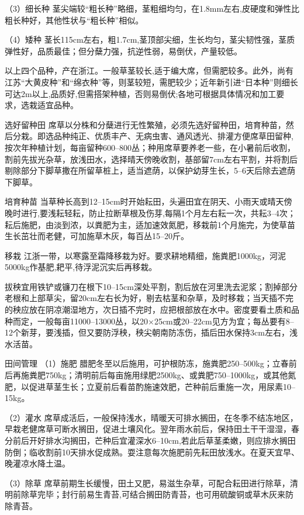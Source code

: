 \documentclass{ctexbook}
\begin{document}
（3）细长种 茎尖端较“粗长种”略细，茎粗细均匀，在1.8mm左右,皮硬度和弹性比粗长种好，其他性状与“粗长种”相似。

（4）矮种 茎长115cm左右，粗1.7cm,茎顶部尖细，生长均匀，茎尖韧性强，茎质弹性好，品质最佳；但分蘖力强，抗逆性弱，易倒伏，产量较低。

以上四个品种，产在浙江。一般草茎较长,适于编大席，但需肥较多。此外，尚有江苏“大黄皮种”和“绵衣种”等，则茎较短，需肥较少；近年新引进“日本种”则细长可达2m以上,品质好,但需搭架种植，否则易倒伏;各地可根据具体情况和加工要求，选栽适宜品种。

选好留种田 席草以分株和分蘖进行无性繁殖，必须先选好留种田，培育种苗，然后分栽。即选品种纯正、优质丰产、无病虫害、通风透光、排灌方便席草田留种,按次年种植计划，每亩留种600--800丛；种用席草要养老一些，在小暑前后收割，割前先拔光杂草，放浅田水，选择晴天傍晚收割，基部留7cm左右平割，并将割后剔除部分下脚草撒在所留草桩上，适当遮荫，以保护幼芽生长，5--6天后除去遮荫下脚草。

培育种苗 当草种长高到12--15cm时开始耘田，头遍田宜在阴天、小雨天或晴天傍晚时进行,要浅耘轻耘，防止拉断草根及伤芽,每隔1个月左右耘一次，共耘3--4次；耘后施肥，由淡到浓，以粪肥为主，适加速效氮肥，移栽前1个月施完，为使草苗生长茁壮而老健，可加施草木灰，每百丛15--20斤。

移栽 江浙一带，以寒露至霜降移栽为好。要求耕地精细，施粪肥1000kg，河泥5000kg作基肥,耙平,待浮泥沉实后再移栽。

拔秧宜用铁铲或镰刀在根下10--15cm深处平割，割后放在河里洗去泥浆；割掉部分老根和上部草尖，留20cm左右长为好，剔去枯茎和杂草，及时移栽；当天插不完的秧应放在阴凉潮湿地方，次日插不完时，应把根部放在水中。密度要看土质和品种而定，一般每亩11000--13000丛，以20$\times$25cm或20--22cm见方为宜；每丛要有8--12个新芽，要浅插，但又要防浮秧，秧尖朝南防冻伤，插后田水保持3cm左右，浅水活苗。

田间管理
（1）施肥 腊肥冬至以后施用，可护根防冻，施粪肥250--500kg；立春前后再施粪肥750kg；清明前后每亩施用绿肥2500kg、或粪肥750--1000kg，或其他氮肥，以促进草茎生长；立夏前后看苗酌施速效肥，芒种前后重施一次，用尿素10--15kg。

（2）灌水 席草成活后，一般保持浅水，晴暖天可排水搁田，在冬季不结冻地区，早栽老健席草可断水搁田，促进土壤风化。翌年雨水前后，保持田土干干湿湿，春分前后开好排水沟搁田，芒种后宜灌深水6--10cm,若此后草茎柔嫩，则应排水搁田防倒；临收割前10天排水促成熟。耍注意每次施肥前先耘田放浅水。在夏天宜早、晚灌凉水降土温。

（3）除草 席草前期生长缓慢，田土又肥，易滋生杂草，可配合耘田进行除草，清明前除草完毕；封行前易生青苔,可结合搁田防青苔，也可用硫酸铜或草木灰来防除青苔。
\end{document}
